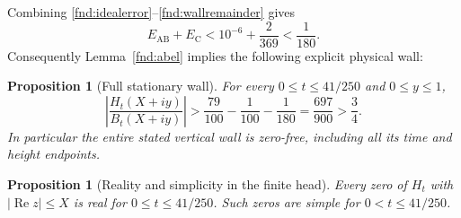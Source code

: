 \documentclass[11pt,a4paper]{article}
\newtheorem{proposition}[theorem]{Proposition}
\theoremstyle{definition}
\theoremstyle{remark}
\newcommand{\Ree}{\operatorname{Re}}
\begin{document}
Combining \eqref{fnd:idealerror}--\eqref{fnd:wallremainder} gives
\[
 E_{\mathrm{AB}}+E_{\mathrm C}
       <10^{-6}+\frac2{369}<\frac1{180}.
\]
Consequently Lemma~\ref{fnd:abel} implies the following explicit physical
wall:
\begin{proposition}[Full stationary wall]\label{fnd:wall}
For every $0\leq t\leq41/250$ and $0\leq y\leq1$,
\begin{equation}
 \left|\frac{H_t(X+iy)}{B_t(X+iy)}\right|
 >\frac{79}{100}-\frac1{100}-\frac1{180}
 =\frac{697}{900}>\frac34.
 \label{fnd:physicalwall}
\end{equation}
In particular the entire stated vertical wall is zero-free, including
all its time and height endpoints.
\end{proposition}

\begin{proposition}[Reality and simplicity in the finite head]
\label{fnd:finite-head}
Every zero of $H_t$ with $|\Ree z|\leq X$ is real for
$0\leq t\leq41/250$. Such zeros are simple for $0<t\leq41/250$.
\end{proposition}
\end{document}
